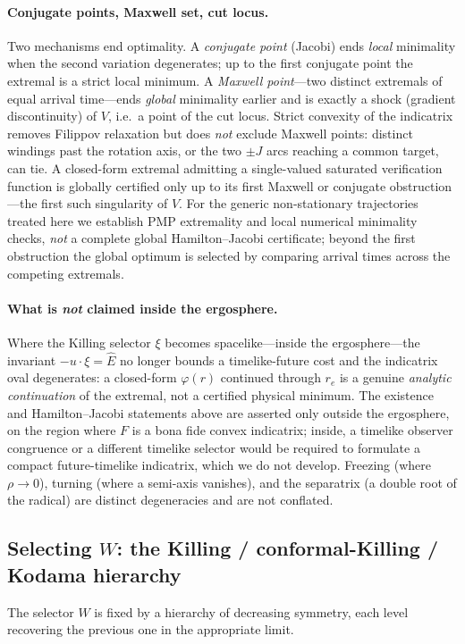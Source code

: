 \documentclass[12pt]{iopart}
\newcommand{\Ehat}{\hat E}
\newcommand{\re}{r_{e}}
\begin{document}
\paragraph{Conjugate points, Maxwell set, cut locus.} Two mechanisms end
optimality. A \emph{conjugate point} (Jacobi) ends \emph{local} minimality when
the second variation degenerates; up to the first conjugate point the extremal is
a strict local minimum. A \emph{Maxwell point}---two distinct extremals of equal
arrival time---ends \emph{global} minimality earlier and is exactly a shock
(gradient discontinuity) of $V$, i.e.\ a point of the cut locus. Strict convexity
of the indicatrix removes Filippov relaxation but does \emph{not} exclude Maxwell
points: distinct windings past the rotation axis, or the two $\pm J$ arcs reaching
a common target, can tie. A closed-form extremal admitting a single-valued saturated
verification function is globally certified only up to its first Maxwell or conjugate
obstruction---the first such singularity of $V$. For the generic non-stationary
trajectories treated here we establish PMP extremality and local numerical minimality
checks, \emph{not} a complete global Hamilton--Jacobi certificate; beyond the first
obstruction the global optimum is selected by comparing arrival times across the competing
extremals.

\paragraph{What is \emph{not} claimed inside the ergosphere.} Where the Killing
selector $\xi$ becomes spacelike---inside the ergosphere---the invariant
$-u\cdot\xi=\Ehat$ no longer bounds a timelike-future cost and the indicatrix oval
degenerates: a closed-form $\varphi(r)$ continued through $\re$ is a genuine
\emph{analytic continuation} of the
extremal, not a certified physical minimum. The existence and Hamilton--Jacobi
statements above are asserted only outside the ergosphere, on the region where $F$
is a bona fide convex indicatrix; inside, a timelike observer congruence or a different
timelike selector would be required to formulate a compact future-timelike indicatrix,
which we do not develop. Freezing (where
$\rho\to0$), turning (where a semi-axis vanishes), and the separatrix (a double
root of the radical) are distinct degeneracies and are not conflated.

\subsection{Selecting $W$: the Killing / conformal-Killing / Kodama hierarchy}
\label{sec:whierarchy}
The selector $W$ is fixed by a hierarchy of decreasing symmetry, each level
recovering the previous one in the appropriate limit.
\end{document}
